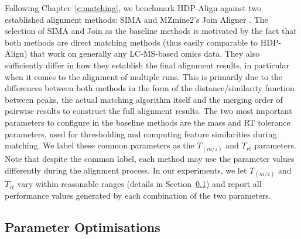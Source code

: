 Following Chapter~\ref{c:matching}, we benchmark HDP-Align against two established alignment methods: SIMA \cite{Voss2011a} and MZmine2's Join Aligner \cite{Pluskal2010}. The selection of SIMA and Join as the baseline methods is motivated by the fact that both methods are direct matching methods (thus easily comparable to HDP-Align) that work on generally any LC-MS-based omics data. They also sufficiently differ in how they establish the final alignment results, in particular when it comes to the alignment of multiple runs. This is primarily due to the differences between both methods in the form of the distance/similarity function between peaks, the actual matching algorithm itself and the merging order of pairwise results to construct the full alignment results. The two most important parameters to configure in the baseline methods are the mass and \ac{RT} tolerance parameters, used for thresholding and computing feature similarities during matching. We label these common parameters as the $T_{(m/z)}$ and $T_{rt}$ parameters. Note that despite the common label, each method may use the parameter values differently during the alignment process. In our experiments, we let $T_{(m/z)}$ and $T_{rt}$ vary within reasonable ranges (details in Section~\ref{sub:parameter-optimisations}) and report all performance values generated by each combination of the two parameters.

\subsection{Parameter Optimisations}
\label{sub:parameter-optimisations}


